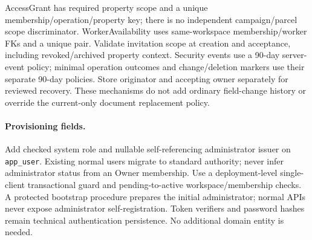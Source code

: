 AccessGrant has required property scope and a unique membership/operation/property
key; there is no independent campaign/parcel scope discriminator. WorkerAvailability
uses same-workspace membership/worker FKs and a unique pair. Validate invitation
scope at creation and acceptance, including revoked/archived property context.
Security events use a 90-day server-event policy; minimal operation outcomes and
change/deletion markers use their separate 90-day policies. Store originator and
accepting owner separately for reviewed recovery. These mechanisms do not add
ordinary field-change history or override the current-only document replacement policy.

\paragraph{Provisioning fields.}
Add checked system role and nullable self-referencing administrator issuer on
\texttt{app\_user}. Existing normal users migrate to standard authority; never infer
administrator status from an Owner membership. Use a deployment-level single-client
transactional guard and pending-to-active workspace/membership checks. A protected
bootstrap procedure prepares the initial administrator; normal APIs never expose
administrator self-registration. Token verifiers and password hashes remain
technical authentication persistence. No additional domain entity is needed.

